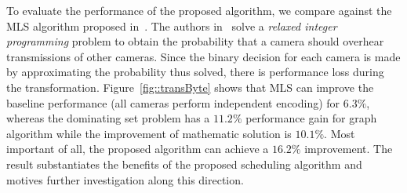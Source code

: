 To evaluate the performance of the proposed algorithm, we compare against the
MLS algorithm proposed in~\cite{MLS}.
The authors in~\cite{MLS} solve a {\em relaxed integer programming} problem to obtain
the probability that a camera should overhear transmissions of other cameras.
Since the binary decision for each camera is made by approximating the probability
thus solved,
there is performance loss during the transformation.
%
Figure~\ref{fig::transByte} shows that MLS can improve the baseline performance
(all cameras perform independent encoding) for $6.3 \%$,
whereas {\color{blue} the dominating set problem has a $11.2 \%$ performance
gain for graph algorithm while the improvement of mathematic solution is
$10.1 \%$. Most important of all,} the proposed algorithm can achieve a
$16.2 \%$ improvement.
%
The result substantiates the benefits of the proposed scheduling algorithm and
motives further investigation along this direction.
